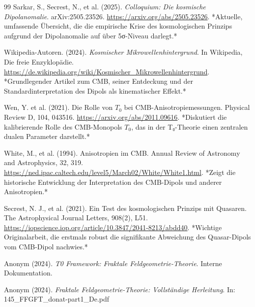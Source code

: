 \begin{thebibliography}{99}
	Sarkar, S., Secrest, N., et al. (2025). \textit{Colloquium: Die kosmische Dipolanomalie}. 
	arXiv:2505.23526.
	\href{https://arxiv.org/abs/2505.23526}{https://arxiv.org/abs/2505.23526}.
	*Aktuelle, umfassende Übersicht, die die empirische Krise des kosmologischen Prinzips aufgrund der Dipolanomalie auf über 5σ-Niveau darlegt.*
	
	Wikipedia-Autoren. (2024). \textit{Kosmischer Mikrowellenhintergrund}. 
	In Wikipedia, Die freie Enzyklopädie.
	\href{https://de.wikipedia.org/wiki/Kosmischer_Mikrowellenhintergrund}{https://de.wikipedia.org/wiki/Kosmischer\_Mikrowellenhintergrund}.
	*Grundlegender Artikel zum CMB, seiner Entdeckung und der Standardinterpretation des Dipols als kinematischer Effekt.*
	
	Wen, Y. et al. (2021). Die Rolle von \(T_0\) bei CMB-Anisotropiemessungen. 
	Physical Review D, 104, 043516.
	\href{https://arxiv.org/abs/2011.09616}{https://arxiv.org/abs/2011.09616}.
	*Diskutiert die kalibrierende Rolle des CMB-Monopols \(T_0\), das in der T₀-Theorie einen zentralen dualen Parameter darstellt.*
	
	White, M., et al. (1994). Anisotropien im CMB. 
	Annual Review of Astronomy and Astrophysics, 32, 319.
	\href{https://ned.ipac.caltech.edu/level5/March02/White/White1.html}{https://ned.ipac.caltech.edu/level5/March02/White/White1.html}.
	*Zeigt die historische Entwicklung der Interpretation des CMB-Dipols und anderer Anisotropien.*
	
	Secrest, N. J., et al. (2021). Ein Test des kosmologischen Prinzips mit Quasaren. 
	The Astrophysical Journal Letters, 908(2), L51.
	\href{https://iopscience.iop.org/article/10.3847/2041-8213/abdd40}{https://iopscience.iop.org/article/10.3847/2041-8213/abdd40}.
	*Wichtige Originalarbeit, die erstmals robust die signifikante Abweichung des Quasar-Dipols vom CMB-Dipol nachwies.*
	
	Anonym (2024). \textit{T0 Framework: Fraktale Feldgeometrie-Theorie}. 
	Interne Dokumentation.
	
	Anonym (2024). \textit{Fraktale Feldgeometrie-Theorie: Vollständige Herleitung}. 
	In: 145\_FFGFT\_donat-part1\_De.pdf
	
\end{thebibliography}